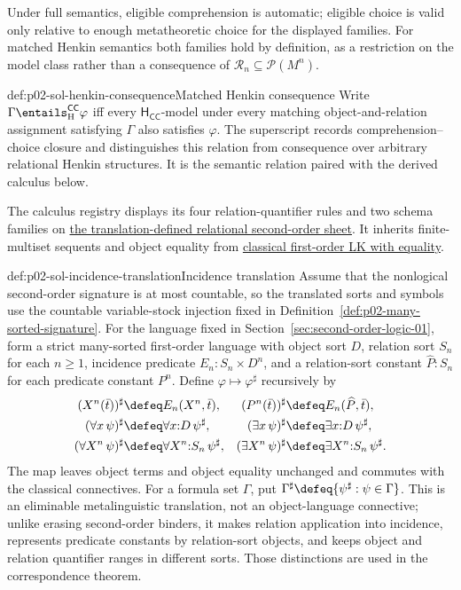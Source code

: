 Under full semantics, eligible comprehension is automatic; eligible choice is
valid only relative to enough metatheoretic choice for the displayed families.
For matched Henkin semantics both families hold by definition, as a restriction
on the model class rather than a consequence of
\(\mathcal R_n\subseteq\mathcal P(M^n)\).

\begin{hbdefinition}{def:p02-sol-henkin-consequence}{Matched Henkin consequence}
Write \(\Gamma\entails_{\mathrm H}^{\mathsf{CC}}\varphi\) iff every
\(\mathsf H_{\mathsf{CC}}\)-model under every matching object-and-relation
assignment satisfying \(\Gamma\) also satisfies \(\varphi\).  The superscript
records comprehension--choice closure and distinguishes this relation from
consequence over arbitrary relational Henkin structures.  It is the semantic
relation paired with the derived calculus below.
\end{hbdefinition}

The calculus registry displays its four relation-quantifier rules and two
schema families on \hyperref[sheet:sol]{the translation-defined relational
second-order sheet}.  It inherits finite-multiset sequents and object equality
from \hyperref[sheet:lk-eq]{classical first-order LK with equality}.

\begin{hbdefinition}{def:p02-sol-incidence-translation}{Incidence translation}
Assume that the nonlogical second-order signature is at most countable, so the
translated sorts and symbols use the countable variable-stock injection fixed
in Definition~\ref{def:p02-many-sorted-signature}.  For the language fixed in
Section~\ref{sec:second-order-logic-01}, form a strict
many-sorted first-order language with object sort \(D\), relation sort \(S_n\)
for each \(n\geq1\), incidence predicate \(E_n:S_n\times D^n\), and a
relation-sort constant \(\widehat P:S_n\) for each predicate constant \(P^n\).
Define \(\varphi\mapsto\varphi^\sharp\) recursively by
\[
\begin{aligned}
 (X^n(\bar t))^\sharp&\defeq E_n(X^n,\bar t),
 & (P^n(\bar t))^\sharp&\defeq E_n(\widehat P,\bar t),\\
 (\forall x\,\psi)^\sharp&\defeq\forall x{:}D\,\psi^\sharp,
 & (\exists x\,\psi)^\sharp&\defeq\exists x{:}D\,\psi^\sharp,\\
 (\forall X^n\,\psi)^\sharp&\defeq\forall X^n{:}S_n\,\psi^\sharp,
 & (\exists X^n\,\psi)^\sharp&\defeq\exists X^n{:}S_n\,\psi^\sharp.
\end{aligned}
\]
The map leaves object terms and object equality unchanged and commutes with
the classical connectives.  For a formula set \(\Gamma\), put
\(\Gamma^\sharp\defeq\{\psi^\sharp:\psi\in\Gamma\}\).  This is an eliminable
metalinguistic translation, not an object-language connective; unlike erasing
second-order binders, it makes relation application into incidence, represents
predicate constants by relation-sort objects, and keeps object and relation
quantifier ranges in different sorts.  Those distinctions are used in the
correspondence theorem.
\end{hbdefinition}


